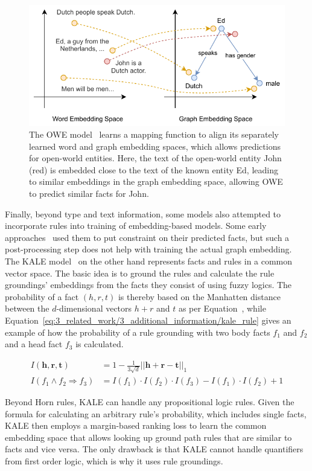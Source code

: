 \begin{figure}[t]
    \centering
    \includegraphics{3_related_work/3_additional_information/owe}
    \caption{The OWE model~\cite{Shah2019AnOE} learns a mapping function to align its separately learned word and graph embedding spaces, which allows predictions for open-world entities. Here, the text of the open-world entity John (red) is embedded close to the text of the known entity Ed, leading to similar embeddings in the graph embedding space, allowing OWE to predict similar facts for John.}
    \label{fig:3_related_work/3_additional_information/owe}
\end{figure}

Finally, beyond type and text information, some models also attempted to incorporate rules into training of embedding-based models. Some early approaches~\cite{Wang2015KnowledgeBC, Wei2015LargescaleKB} used them to put constraint on their predicted facts, but such a post-processing step does not help with training the actual graph embedding. The KALE model~\cite{Guo2016JointlyEK} on the other hand represents facts and rules in a common vector space. The basic idea is to ground the rules and calculate the rule groundings' embeddings from the facts they consist of using fuzzy logics. The probability of a fact $(h, r, t)$ is thereby based on the Manhatten distance between the $d$-dimensional vectors $h + r$ and $t$ as per Equation~\cite{eq:3_related_work/3_additional_information/kale_fac}, while Equation~\ref{eq:3_related_work/3_additional_information/kale_rule} gives an example of how the probability of a rule grounding with two body facts $f_1$ and $f_2$ and a head fact $f_3$ is calculated.

\begin{align}
    I(\textbf{h}, \textbf{r}, \textbf{t}) &= 1 - \frac{1}{3 \sqrt {d}} {|| \textbf{h} + \textbf{r} - \textbf{t} ||}_1
    \label{eq:3_related_work/3_additional_information/kale_fact} \\
    I(f_1 \land f_2 \Rightarrow f_3) &= I(f_1) \cdot I(f_2) \cdot I(f_3) - I(f_1) \cdot I(f_2) + 1
    \label{eq:3_related_work/3_additional_information/kale_rule}
\end{align}

Beyond Horn rules, KALE can handle any propositional logic rules. Given the formula for calculating an arbitrary rule's probability, which includes single facts, KALE then employs a margin-based ranking loss to learn the common embedding space that allows looking up ground path rules that are similar to facts and vice versa. The only drawback is that KALE cannot handle quantifiers from first order logic, which is why it uses rule groundings.
